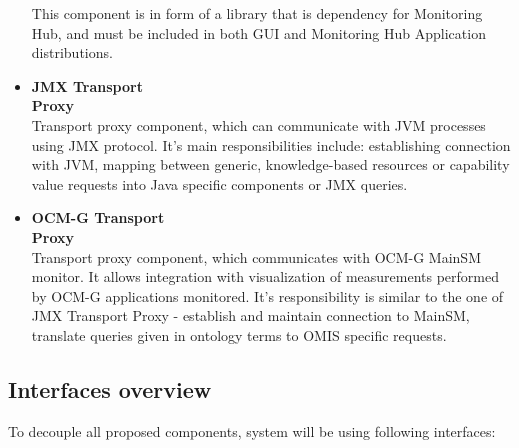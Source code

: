 \begin{itemize}
This component is in form of a library that is dependency for Monitoring Hub, and must be included in both GUI and
Monitoring Hub Application distributions.


 \item {\bf JMX Transport Proxy}~~~~~~~~~~~~~~~~~~~~~~~~~~~~~~~~~~~~~~~~~~~~~~~~~~~~~~~~\linebreak
Transport proxy component, which can communicate with JVM processes using JMX protocol. It's main responsibilities
include: establishing connection with JVM, mapping between generic, knowledge-based resources or capability value
requests into Java specific components or JMX queries.

 \item {\bf OCM-G Transport Proxy}~~~~~~~~~~~~~~~~~~~~~~~~~~~~~~~~~~~~~~~~~~~~~~~~~~~~~~~~\linebreak
Transport proxy component, which communicates with OCM-G MainSM monitor. It allows integration with visualization of
measurements performed by OCM-G applications monitored. It's responsibility is similar to the one of JMX Transport Proxy
- establish and maintain connection to MainSM, translate queries given in ontology terms to OMIS specific requests.

\end{itemize}


\subsection{Interfaces overview}

To decouple all proposed components, system will be using following interfaces:

